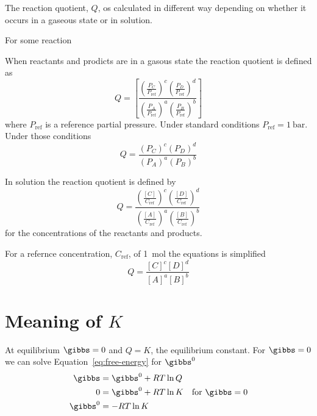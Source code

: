 \documentclass[../mit-general-chemistry.tex]{subfiles}
\begin{document}
The reaction quotient, $Q$, os calculated in different way depending
on whether it occurs in a gaseous state or in solution.

For some reaction


When reactants and prodicts are in a gasous state the reaction
quotient is defined as
\begin{equation}
  Q =
  \left[
    \frac{
      \left( \frac{P_C}{P_{\text{ref}}} \right)^c
      \left( \frac{P_D}{P_{\text{ref}}} \right)^d
    }{
      \left( \frac{P_A}{P_{\text{ref}}} \right)^a
      \left( \frac{P_B}{P_{\text{ref}}} \right)^b
    }
    \right]
\end{equation}
where $P_{\text{ref}}$ is a reference partial pressure. Under standard
conditions $P_{\text{ref}} = \SI{1}{\bar}$. Under those conditions
\begin{equation}
  Q =
  \frac{
    (P_C)^c
    (P_D)^d
  }{
    (P_A)^a
    (P_B)^b
  }
\end{equation}


In solution the reaction quotient is defined by
\begin{equation}
  Q = \frac{
    \left( \frac{[C]}{C_{\text{ref}}} \right)^c
    \left( \frac{[D]}{C_{\text{ref}}} \right)^d
  }{
    \left( \frac{[A]}{C_{\text{ref}}} \right)^a
    \left( \frac{[B]}{C_{\text{ref}}} \right)^b
  }
\end{equation}
for the concentrations of the reactants and products.

For a refernce concentration, $C_{\text{ref}}$, of \SI{1}{\mol} the
equations is simplified
\begin{equation}
  Q = \frac{ [C]^c [D]^d }{ [A]^a [B]^b }
\end{equation}











\section{Meaning of $K$}



At equilibrium $\gibbs = 0$ and $Q = K$, the equilibrium constant. For
$\gibbs = 0$ we can solve Equation~\ref{eq:free-energy} for $\gibbs^0$
\begin{align*}
  \gibbs &= \gibbs^0 + RT \ln Q \\
  0 &= \gibbs^0 + RT \ln K & \text{for } \gibbs = 0 \\
  \gibbs^0 &= -RT \ln K \\
\end{align*}
\end{document}
